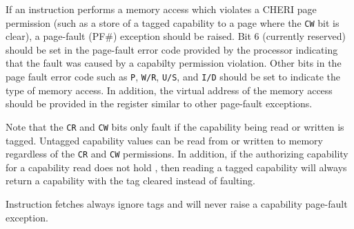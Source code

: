 If an instruction performs a memory access which violates a CHERI page
permission (such as a store of a tagged capability to a page where the
\texttt{CW} bit is clear), a page-fault (PF\#) exception should be
raised.  Bit 6 (currently reserved) should be set in the page-fault
error code provided by the processor indicating that the fault was
caused by a capabilty permission violation.  Other bits in the page
fault error code such as \texttt{P}, \texttt{W/R}, \texttt{U/S}, and
\texttt{I/D} should be set to indicate the type of memory access.  In
addition, the virtual address of the memory access should be provided
in the \CRTWO{} register similar to other page-fault exceptions.

Note that the \texttt{CR} and \texttt{CW} bits only fault if the
capability being read or written is tagged.  Untagged capability
values can be read from or written to memory regardless of the
\texttt{CR} and \texttt{CW} permissions.  In addition, if the
authorizing capability for a capability read does not hold \cappermLC,
then reading a tagged capability will always return a capability with
the tag cleared instead of faulting.

Instruction fetches always ignore tags and will never raise a
capability page-fault exception.
